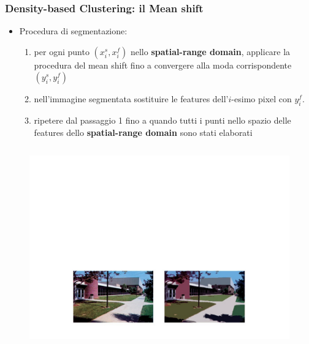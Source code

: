 \begin{frame}

	\frametitle{{\color{GradientDescentDiagramRed}Density-based Clustering}: il Mean shift}


		\begin{itemize}
			\item Procedura di segmentazione:
				\begin{enumerate}
					\item per ogni punto $(x_i^s, x_i^f)$ nello \textbf{spatial-range domain}, applicare la procedura del mean shift fino a convergere alla moda corrispondente $(y_i^s, y_i^f)$
					\item nell'immagine segmentata sostituire le features dell'$i$-esimo pixel con $y_i^f$.
					\item ripetere dal passaggio 1 fino a quando tutti i punti nello spazio delle features dello \textbf{spatial-range domain} sono stati elaborati
				\end{enumerate}
		\end{itemize}

		\begin{columns}

			\begin{figure}[!htbp]
				\centering
				\includegraphics[width=0.8\linewidth]{images/unsupervised/non_parametric/mean_shift_result_1.pdf}
			\end{figure}


\end{columns}
\end{frame}
